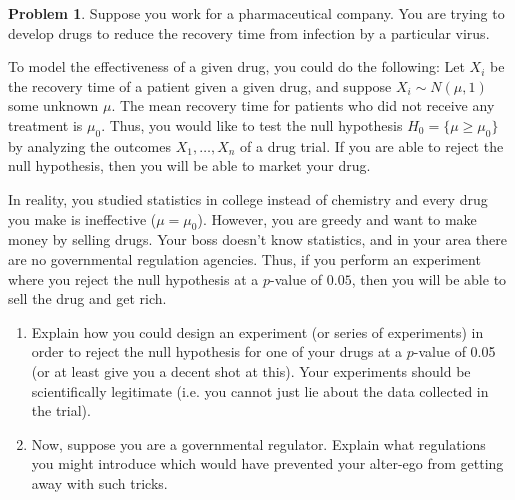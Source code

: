 \documentclass[13pt]{article}
\theoremstyle{definition}
\newtheorem{problem}[theorem]{Problem}
\theoremstyle{remark}
\begin{document}
\begin{problem}
Suppose you work for a pharmaceutical company.
You are trying to develop drugs to reduce the recovery time from infection by a particular virus.

To model the effectiveness of a given drug, you could do the following:
    Let $X_i$ be the recovery time of a patient given a given drug, and suppose $X_i\sim N(\mu,1)$ some unknown $\mu$.
    The mean recovery time for patients who did not receive any treatment is $\mu_0$. Thus, you would like to test the null hypothesis $H_0 = \{ \mu \geq \mu_0 \}$ by analyzing the outcomes $X_1, \ldots, X_n$ of a drug trial.
    If you are able to reject the null hypothesis, then you will be able to market your drug.

    In reality, you studied statistics in college instead of chemistry and every drug you make is ineffective ($\mu = \mu_0$).
    However, you are greedy and want to make money by selling drugs. 
    Your boss doesn't know statistics, and in your area there are no governmental regulation agencies.
    Thus, if you perform an experiment where you reject the null hypothesis at a $p$-value of $0.05$, then you will be able to sell the drug and get rich.
    
    \begin{enumerate}[label=(\alph*),topsep=0pt]
        \item Explain how you could design an experiment (or series of experiments) in order to reject the null hypothesis for one of your drugs at a $p$-value of 0.05 (or at least give you a decent shot at this).
            Your experiments should be scientifically legitimate (i.e. you cannot just lie about the data collected in the trial).

        \item Now, suppose you are a governmental regulator. 
            Explain what regulations you might introduce which would have prevented your alter-ego from getting away with such tricks.
    
    \end{enumerate}

\end{problem}
\end{document}

